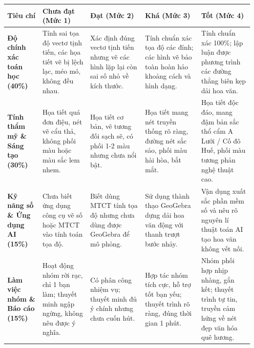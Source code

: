 \documentclass[12pt, a4paper]{article}
\begin{document}
\begin{center}  
\small  
\begin{tabularx}{\textwidth}{|p{2.8cm}|X|X|X|X|}  
\hline  
\textbf{Tiêu chí} & \textbf{Chưa đạt (Mức 1)} & \textbf{Đạt (Mức 2)} & \textbf{Khá (Mức 3)} & \textbf{Tốt (Mức 4)} \\ \hline  
\textbf{Độ chính xác toán học (40\%)} & Tính sai tọa độ vectơ tịnh tiến, các họa tiết vẽ bị lệch lạc, méo mó, không đều nhau. & Xác định đúng vectơ tịnh tiến nhưng vẽ các hình lặp lại còn sai số nhỏ về kích thước. & Tính chuẩn xác tọa độ các đỉnh; các hình vẽ bảo toàn hoàn hảo khoảng cách và hình dạng. & Tính chuẩn xác 100\%; lập luận được phương trình các đường thẳng biên kẹp dải hoa văn. \\ \hline  
\textbf{Tính thẩm mỹ \& Sáng tạo (30\%)} & Họa tiết quá đơn điệu, nét vẽ cẩu thả, không phối màu hoặc màu sắc lem nhem. & Họa tiết cơ bản, vẽ tương đối sạch sẽ, có phối 1-2 màu nhưng chưa nổi bật. & Họa tiết mang nét truyền thống rõ ràng, đường nét sắc sảo, phối màu hài hòa, bắt mắt. & Họa tiết độc đáo, mang đậm bản sắc thổ cẩm A Lưới / Cố đô Huế, phối màu tương phản nghệ thuật cao. \\ \hline  
\textbf{Kỹ năng số \& Ứng dụng AI (15\%)} & Chưa biết ứng dụng công cụ vẽ số hoặc MTCT vào tính toán tọa độ. & Biết dùng MTCT tính tọa độ nhưng chưa dùng được GeoGebra để mô phỏng. & Sử dụng thành thạo GeoGebra dựng dải hoa văn động với thanh trượt bước nhảy. & Vận dụng xuất sắc phần mềm số và nêu rõ nguyên lí thuật toán AI tạo hoa văn không vết nối. \\ \hline  
\textbf{Làm việc nhóm \& Báo cáo (15\%)} & Hoạt động nhóm rời rạc, chỉ 1 bạn làm; thuyết minh ngập ngừng, không nêu được ý nghĩa. & Có phân công nhiệm vụ; thuyết minh đủ ý chính nhưng chưa cuốn hút. & Hợp tác nhóm tích cực, hỗ trợ tốt bạn yếu; thuyết trình rõ ràng, đúng thời gian 1 phút. & Nhóm phối hợp nhịp nhàng, gắn kết; thuyết trình tự tin, truyền cảm hứng về nét đẹp văn hóa quê hương. \\ \hline  
\end{tabularx}  
\end{center}  
  
\end{document}
